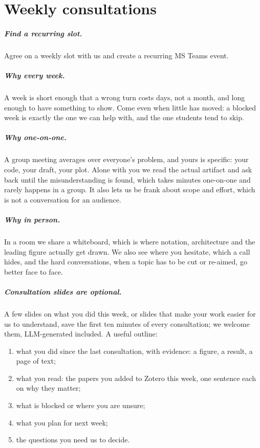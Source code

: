 \chapter{Weekly consultations}\label{app:consult}
\paragraph{Find a recurring slot.} Agree on a weekly slot with us and create a recurring MS Teams event.

\paragraph{Why every week.} A week is short enough that a wrong turn costs days, not a month, and long enough to have something to show. Come even when little has moved: a blocked week is exactly the one we can help with, and the one students tend to skip.

\paragraph{Why one-on-one.} A group meeting averages over everyone's problem, and yours is specific: your code, your draft, your plot. Alone with you we read the actual artifact and ask back until the misunderstanding is found, which takes minutes one-on-one and rarely happens in a group. It also lets us be frank about scope and effort, which is not a conversation for an audience.

\paragraph{Why in person.} In a room we share a whiteboard, which is where notation, architecture and the leading figure actually get drawn. We also see where you hesitate, which a call hides, and the hard conversations, when a topic has to be cut or re-aimed, go better face to face.

\paragraph{Consultation slides are optional.} A few slides on what you did this week, or slides that make your work easier for us to understand, save the first ten minutes of every consultation; we welcome them, LLM-generated included. A useful outline:
\begin{enumerate}[noitemsep]
  \item what you did since the last consultation, with evidence: a figure, a result, a page of text;
  \item what you read: the papers you added to Zotero this week, one sentence each on why they matter;
  \item what is blocked or where you are unsure;
  \item what you plan for next week;
  \item the questions you need us to decide.
\end{enumerate}

